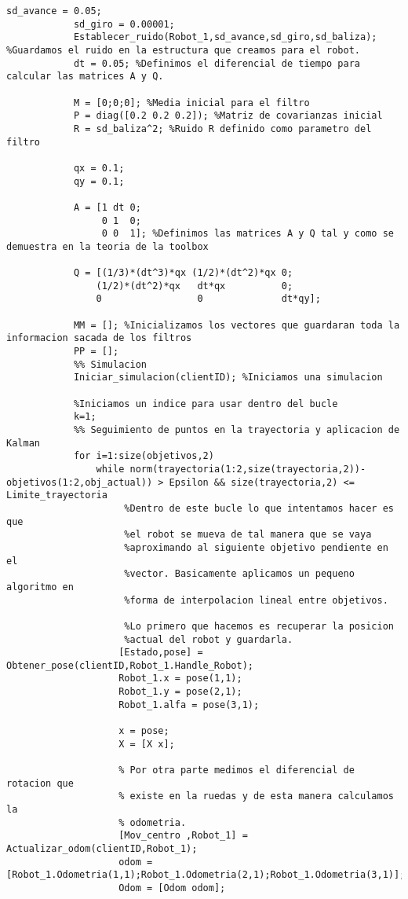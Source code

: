 \begin{lstlisting}[frame=single]
            sd_avance = 0.05;
            sd_giro = 0.00001;
            Establecer_ruido(Robot_1,sd_avance,sd_giro,sd_baliza); %Guardamos el ruido en la estructura que creamos para el robot.
            dt = 0.05; %Definimos el diferencial de tiempo para calcular las matrices A y Q.

            M = [0;0;0]; %Media inicial para el filtro
            P = diag([0.2 0.2 0.2]); %Matriz de covarianzas inicial
            R = sd_baliza^2; %Ruido R definido como parametro del filtro 

            qx = 0.1;
            qy = 0.1;

            A = [1 dt 0;
                 0 1  0;
                 0 0  1]; %Definimos las matrices A y Q tal y como se demuestra en la teoria de la toolbox

            Q = [(1/3)*(dt^3)*qx (1/2)*(dt^2)*qx 0;
                (1/2)*(dt^2)*qx   dt*qx          0;
                0                 0              dt*qy];

            MM = []; %Inicializamos los vectores que guardaran toda la informacion sacada de los filtros
            PP = [];
            %% Simulacion
            Iniciar_simulacion(clientID); %Iniciamos una simulacion 

            %Iniciamos un indice para usar dentro del bucle
            k=1;
            %% Seguimiento de puntos en la trayectoria y aplicacion de Kalman
            for i=1:size(objetivos,2)
                while norm(trayectoria(1:2,size(trayectoria,2))-objetivos(1:2,obj_actual)) > Epsilon && size(trayectoria,2) <= Limite_trayectoria
                     %Dentro de este bucle lo que intentamos hacer es que
                     %el robot se mueva de tal manera que se vaya
                     %aproximando al siguiente objetivo pendiente en el
                     %vector. Basicamente aplicamos un pequeno algoritmo en
                     %forma de interpolacion lineal entre objetivos.
                     
                     %Lo primero que hacemos es recuperar la posicion
                     %actual del robot y guardarla.
                    [Estado,pose] = Obtener_pose(clientID,Robot_1.Handle_Robot);
                    Robot_1.x = pose(1,1);
                    Robot_1.y = pose(2,1);
                    Robot_1.alfa = pose(3,1);
                   
                    x = pose;
                    X = [X x];
                    
                    % Por otra parte medimos el diferencial de rotacion que
                    % existe en la ruedas y de esta manera calculamos la
                    % odometria.
                    [Mov_centro ,Robot_1] = Actualizar_odom(clientID,Robot_1);
                    odom = [Robot_1.Odometria(1,1);Robot_1.Odometria(2,1);Robot_1.Odometria(3,1)];
                    Odom = [Odom odom];
     

\end{lstlisting}
